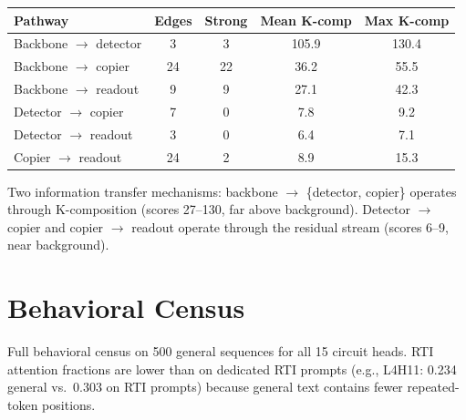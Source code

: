 \documentclass{article}
\begin{document}
\begin{appendices}
\begin{table}[h]
\centering
\begin{tabular}{lcccc}
\toprule
\textbf{Pathway} & \textbf{Edges} & \textbf{Strong} & \textbf{Mean K-comp} & \textbf{Max K-comp} \\
\midrule
Backbone $\to$ detector & 3 & 3 & 105.9 & 130.4 \\
Backbone $\to$ copier & 24 & 22 & 36.2 & 55.5 \\
Backbone $\to$ readout & 9 & 9 & 27.1 & 42.3 \\
Detector $\to$ copier & 7 & 0 & 7.8 & 9.2 \\
Detector $\to$ readout & 3 & 0 & 6.4 & 7.1 \\
Copier $\to$ readout & 24 & 2 & 8.9 & 15.3 \\
\bottomrule
\end{tabular}
\end{table}

Two information transfer mechanisms: backbone $\to$ \{detector, copier\}
operates through K-composition (scores 27--130, far above background).
Detector $\to$ copier and copier $\to$ readout operate through the
residual stream (scores 6--9, near background).


\section{Behavioral Census}
\label{app:behavioral}

Full behavioral census on 500 general sequences for all 15 circuit
heads. RTI attention fractions are lower than on dedicated RTI prompts
(e.g., L4H11: 0.234 general vs.\ 0.303 on RTI prompts) because general
text contains fewer repeated-token positions.


\end{appendices}
\end{document}
